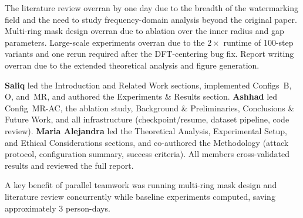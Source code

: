 \documentclass[10pt,twocolumn]{article}
\begin{document}
The literature review overran by one day due to the breadth of the
watermarking field and the need to study frequency-domain analysis
beyond the original paper.
Multi-ring mask design overran due to ablation over the inner radius
and gap parameters.
Large-scale experiments overran due to the $2\times$ runtime of
100-step variants and one rerun required after the DFT-centering bug fix.
Report writing overran due to the extended theoretical analysis and
figure generation.

\textbf{Saliq} led the Introduction and Related Work sections, implemented
Configs~B, O, and~MR, and authored the Experiments \& Results section.
\textbf{Ashhad} led Config~MR-AC, the ablation study, Background \&
Preliminaries, Conclusions \& Future Work, and all infrastructure
(checkpoint/resume, dataset pipeline, code review).
\textbf{Maria Alejandra} led the Theoretical Analysis, Experimental Setup,
and Ethical Considerations sections, and co-authored the Methodology
(attack protocol, configuration summary, success criteria).
All members cross-validated results and reviewed the full report.

A key benefit of parallel teamwork was running multi-ring mask design
and literature review concurrently while baseline experiments computed,
saving approximately 3 person-days.
\end{document}
